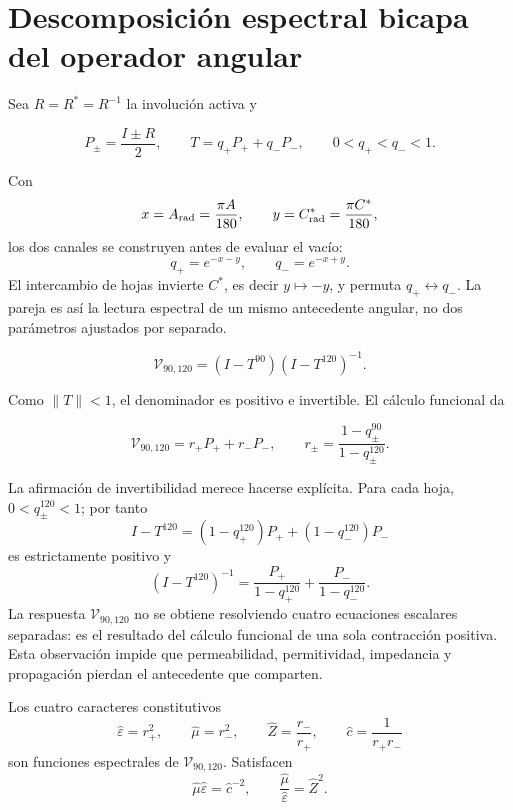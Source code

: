 \section{Descomposici\'on espectral bicapa del operador angular}

Sea \(R=R^*=R^{-1}\) la involuci\'on activa y

\[
P_\pm=\frac{I\pm R}{2},
\qquad
T=q_+P_+ +q_-P_-,
\qquad 0<q_+<q_-<1.
\]

Con
\[
x=A_{\rm rad}=\frac{\pi A}{180},\qquad
y=C^*_{\rm rad}=\frac{\pi C^*}{180},
\]
los dos canales se construyen antes de evaluar el vac\'io:
\begin{equation}
q_+=e^{-x-y},\qquad q_-=e^{-x+y}.
\label{eq:vacuum-angular-channels}
\end{equation}
El intercambio de hojas invierte \(C^*\), es decir \(y\mapsto-y\), y permuta \(q_+\leftrightarrow q_-\). La pareja es as\'i la lectura espectral de un mismo antecedente angular, no dos par\'ametros ajustados por separado.

\begin{definition}
\begin{equation}
\mathcal V_{90,120}=(I-T^{90})(I-T^{120})^{-1}.
\label{eq:vacuum-operator}
\end{equation}
\end{definition}

Como \(\|T\|<1\), el denominador es positivo e invertible. El c\'alculo funcional da

\begin{equation}
\mathcal V_{90,120}=r_+P_+ +r_-P_-,
\qquad
r_\pm=\frac{1-q_\pm^{90}}{1-q_\pm^{120}}.
\label{eq:vacuum-eigenvalues}
\end{equation}

La afirmaci\'on de invertibilidad merece hacerse expl\'icita. Para cada hoja,
\(0<q_\pm^{120}<1\); por tanto
\[
I-T^{120}=(1-q_+^{120})P_++(1-q_-^{120})P_-
\]
es estrictamente positivo y
\[
(I-T^{120})^{-1}
=\frac{P_+}{1-q_+^{120}}+
 \frac{P_-}{1-q_-^{120}}.
\]
La respuesta \(\mathcal V_{90,120}\) no se obtiene resolviendo cuatro
ecuaciones escalares separadas: es el resultado del c\'alculo funcional de una
sola contracci\'on positiva. Esta observaci\'on impide que permeabilidad,
permitividad, impedancia y propagaci\'on pierdan el antecedente que comparten.

\begin{theorem}
Los cuatro caracteres constitutivos
\begin{equation}
\widehat\varepsilon=r_+^2,\qquad
\widehat\mu=r_-^2,\qquad
\widehat Z=\frac{r_-}{r_+},\qquad
\widehat c=\frac1{r_+r_-}
\label{eq:vacuum-four}
\end{equation}
son funciones espectrales de \(\mathcal V_{90,120}\). Satisfacen
\begin{equation}
\widehat\mu\widehat\varepsilon=\widehat c^{-2},
\qquad
\frac{\widehat\mu}{\widehat\varepsilon}=\widehat Z^2.
\label{eq:vacuum-relations}
\end{equation}
\end{theorem}

